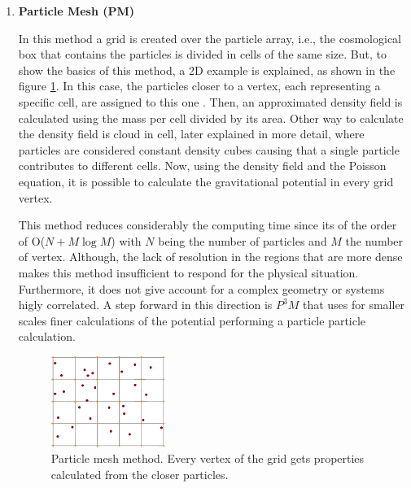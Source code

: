 \begin{enumerate}
\item \textbf{Particle Mesh (PM)}

In this method a grid is created over the particle array,
i.e., the cosmological box that contains the particles is divided in 
cells of the same size. 
But, to show the basics of this method, a 2D example is explained, 
as shown in the figure \ref{PM}. In this case, the particles closer
to a vertex, each representing a specific cell, are assigned to this one \cite{tree}.
Then, an approximated density field is calculated using 
the mass per cell divided by its area. 
Other way to calculate the density field is cloud in cell, later explained
in more detail, where particles are considered constant density cubes causing
that a single particle contributes to different cells.
Now, using the density field and the Poisson equation, it is possible to calculate 
the gravitational potential in every grid vertex.

This method reduces considerably the computing time 
since its of the order of O($N+M\log M$) with $N$ being the number of particles
and $M$ the number of vertex. Although, the lack of resolution in the regions that are
more dense makes this method insufficient to respond for the physical situation.
Furthermore, it does not give account for a complex geometry or systems
higly correlated. A step forward in this direction is $P^3M$ that uses for smaller scales finer calculations of the potential performing a particle particle calculation. 

\begin{figure}[htbp]
       \centering
               \includegraphics[width=0.35\textwidth]{Images/chapter3/MG.png}
       \caption{\small Particle mesh method. Every vertex of the grid gets 
       properties calculated from the closer particles.}
       \label{PM}
 \end{figure}



\end{enumerate}
